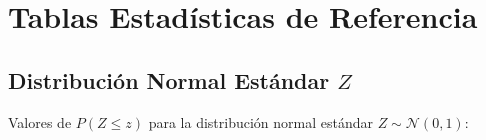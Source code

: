 \documentclass[
  10pt,           %
  twoside,        %
  openright       %
]{book}
\begin{document}
\tableofcontents
\listoffigures
\listoftables



\mainmatter

\pagestyle{fancy}


\cleardoublepage


\cleardoublepage


\cleardoublepage


\cleardoublepage

\backmatter

\appendix
\chapter{Tablas Estadísticas de Referencia}

\section{Distribución Normal Estándar $Z$}

Valores de $P(Z \leq z)$ para la distribución normal estándar
$Z \sim \mathcal{N}(0, 1)$:
\end{document}

